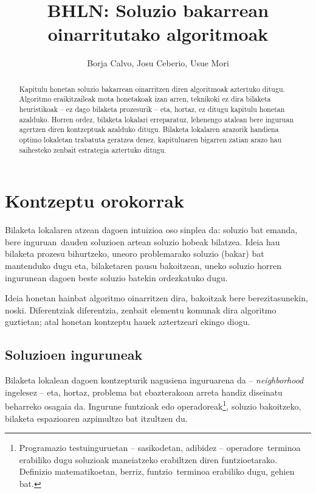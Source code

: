 \documentclass[eu]{ifirak}\usepackage[]{graphicx}\usepackage[]{color}
\newcommand{\zkk}{\guillemotleft}
\newcommand{\skk}{\guillemotright}
\begin{document}
\title{BHLN: Soluzio bakarrean oinarritutako algoritmoak}
\date{}
\author{Borja Calvo, Josu Ceberio, Usue Mori}




\maketitle

\begin{abstract}
Kapitulu honetan soluzio bakarrean oinarritzen diren algoritmoak aztertuko ditugu. Algoritmo eraikitzaileak mota honetakoak izan arren, teknikoki ez dira bilaketa heuristikoak -- ez dago bilaketa prozesurik -- eta, hortaz, ez ditugu kapitulu honetan azalduko. Horren ordez, bilaketa lokalari erreparatuz, lehenengo atalean bere inguruan agertzen diren kontzeptuak azalduko ditugu. Bilaketa lokalaren arazorik handiena optimo lokaletan trabatuta geratzea denez, kapituluaren bigarren zatian arazo hau saihesteko zenbait estrategia aztertuko ditugu.
\end{abstract}

\section{Kontzeptu orokorrak}
Bilaketa lokalaren atzean dagoen intuizioa oso sinplea da: soluzio bat emanda, bere \zkk inguruan\skk\ dauden soluzioen artean soluzio hobeak bilatzea. Ideia hau bilaketa prozesu bihurtzeko, uneoro problemarako soluzio (bakar) bat mantenduko dugu eta, bilaketaren pausu bakoitzean, uneko soluzio horren ingurunean dagoen beste soluzio batekin ordezkatuko dugu. 

Ideia honetan hainbat algoritmo oinarritzen dira, bakoitzak bere berezitasunekin, noski. Diferentziak diferentzia, zenbait elementu komunak dira algoritmo guztietan; atal honetan kontzeptu hauek aztertzeari ekingo diogu.

\subsection{Soluzioen inguruneak}

Bilaketa lokalean dagoen kontzepturik nagusiena inguruarena da -- \textit{neighborhood} ingelesez -- eta, hortaz, problema bat ebazterakoan arreta handiz diseinatu beharreko osagaia da. Ingurune funtzioak edo operadoreak\footnote{Programazio testuinguruetan -- sasikodetan, adibidez -- \zkk operadore\skk\ terminoa erabiliko dugu soluzioak maneiatzeko erabiltzen diren funtzioetarako. Definizio matematikoetan, berriz, \zkk funtzio\skk\  terminoa erabiliko dugu, gehien bat.}, soluzio bakoitzeko, bilaketa espazioaren azpimultzo bat itzultzen du.
\end{document}
